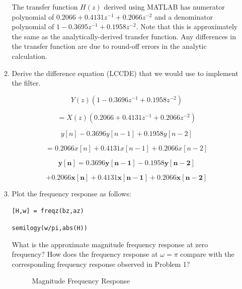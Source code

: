 \documentclass[fleqn]{article}
\begin{document}
\begin{enumerate}[nolistsep]
\begin{enumerate}
			The transfer function $H(z)$ derived using MATLAB has numerator polynomial of $0.2066 + 0.4131z^{-1} + 0.2066z^{-2}$ and a denominator polynomial of $1 - 0.3695z^{-1} + 0.1958z^{-2}$. Note that this is approximately the same as the analytically-derived transfer function. Any differences in the transfer function are due to round-off errors in the analytic calculation.
			
			\item Derive the difference equation (LCCDE) that we would use to implement the filter.
			
			\begin{equation*}
				Y(z)(1 - 0.3696z^{-1} + 0.1958z^{-2})
			\end{equation*}
			
			\begin{equation*}			
				= X(z)(0.2066 + 0.4131z^{-1} + 0.2066z^{-2})
			\end{equation*}
			
			\begin{equation*}
				y[n] - 0.3696y[n-1] + 0.1958y[n-2]
			\end{equation*}
			
			\begin{equation*}
				 = 0.2066x[n] + 0.4131x[n-1] + 0.2066x[n-2]
			\end{equation*}
			
			\begin{equation*}
				\mathbf{y[n] = 0.3696y[n-1] - 0.1958y[n-2]}
			\end{equation*}
			
			\begin{equation*}
				\mathbf{+ 0.2066x[n] + 0.4131x[n-1] + 0.2066x[n-2]}
			\end{equation*}
			
			\item Plot the frequency response as follows:
			
			\texttt{[H,w] = freqz(bz,az)}
			
			\texttt{semilogy(w/pi,abs(H))}
			
			What is the approximate magnitude frequency response at zero frequency? How does the frequency response at $\omega = \pi$ compare with the corresponding frequency response observed in Problem 1?
			
			\begin{figure}[H]
					\centerline{}
					\caption{Magnitude Frequency Response}
			\end{figure}
			

\end{enumerate}
\end{enumerate}
\end{document}
